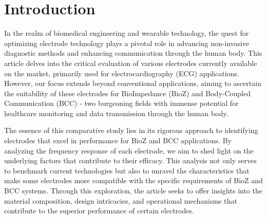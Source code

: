 \section{Introduction}

In the realm of biomedical engineering and wearable technology, the quest for optimizing electrode technology plays a pivotal role in advancing non-invasive diagnostic methods and enhancing communication through the human body. This article delves into the critical evaluation of various electrodes currently available on the market, primarily used for electrocardiography (ECG) applications. However, our focus extends beyond conventional applications, aiming to ascertain the suitability of these electrodes for BioImpedance (BioZ) and Body-Coupled Communication (BCC) - two burgeoning fields with immense potential for healthcare monitoring and data transmission through the human body.

The essence of this comparative study lies in its rigorous approach to identifying electrodes that excel in performance for BioZ and BCC applications. By analyzing the frequency response of each electrode, we aim to shed light on the underlying factors that contribute to their efficacy. This analysis not only serves to benchmark current technologies but also to unravel the characteristics that make some electrodes more compatible with the specific requirements of BioZ and BCC systems. Through this exploration, the article seeks to offer insights into the material composition, design intricacies, and operational mechanisms that contribute to the superior performance of certain electrodes.


